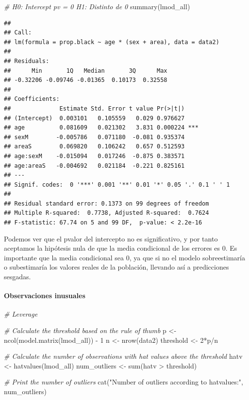 \documentclass[
]{article}
\newenvironment{Shaded}{\begin{snugshade}}{\end{snugshade}}
\newcommand{\CommentTok}[1]{\textcolor[rgb]{0.56,0.35,0.01}{\textit{#1}}}
\newcommand{\DecValTok}[1]{\textcolor[rgb]{0.00,0.00,0.81}{#1}}
\newcommand{\FunctionTok}[1]{\textcolor[rgb]{0.00,0.00,0.00}{#1}}
\newcommand{\NormalTok}[1]{#1}
\newcommand{\OtherTok}[1]{\textcolor[rgb]{0.56,0.35,0.01}{#1}}
\newcommand{\SpecialCharTok}[1]{\textcolor[rgb]{0.00,0.00,0.00}{#1}}
\newcommand{\StringTok}[1]{\textcolor[rgb]{0.31,0.60,0.02}{#1}}
\begin{document}
\begin{Shaded}
\begin{Highlighting}[]
\CommentTok{\# H0: Intercept pv = 0 H1: Distinto de 0}
\FunctionTok{summary}\NormalTok{(lmod\_all)}
\end{Highlighting}
\end{Shaded}

\begin{verbatim}
## 
## Call:
## lm(formula = prop.black ~ age * (sex + area), data = data2)
## 
## Residuals:
##      Min       1Q   Median       3Q      Max 
## -0.32206 -0.09746 -0.01365  0.10173  0.32558 
## 
## Coefficients:
##              Estimate Std. Error t value Pr(>|t|)    
## (Intercept)  0.003101   0.105559   0.029 0.976627    
## age          0.081609   0.021302   3.831 0.000224 ***
## sexM        -0.005786   0.071180  -0.081 0.935374    
## areaS        0.069820   0.106242   0.657 0.512593    
## age:sexM    -0.015094   0.017246  -0.875 0.383571    
## age:areaS   -0.004692   0.021184  -0.221 0.825161    
## ---
## Signif. codes:  0 '***' 0.001 '**' 0.01 '*' 0.05 '.' 0.1 ' ' 1
## 
## Residual standard error: 0.1373 on 99 degrees of freedom
## Multiple R-squared:  0.7738, Adjusted R-squared:  0.7624 
## F-statistic: 67.74 on 5 and 99 DF,  p-value: < 2.2e-16
\end{verbatim}

Podemos ver que el pvalor del intercepto no es significativo, y por
tanto aceptamos la hipótesis nula de que la media condicional de los
errores es 0. Es importante que la media condicional sea 0, ya que si no
el modelo sobreestimaría o subestimaría los valores reales de la
población, llevando así a predicciones sesgadas.

\hypertarget{observaciones-inusuales}{%
\paragraph{Observaciones inusuales}\label{observaciones-inusuales}}

\begin{Shaded}
\begin{Highlighting}[]
\CommentTok{\# Leverage}

\CommentTok{\# Calculate the threshold based on the rule of thumb}
\NormalTok{p }\OtherTok{\textless{}{-}} \FunctionTok{ncol}\NormalTok{(}\FunctionTok{model.matrix}\NormalTok{(lmod\_all)) }\SpecialCharTok{{-}} \DecValTok{1}
\NormalTok{n }\OtherTok{\textless{}{-}} \FunctionTok{nrow}\NormalTok{(data2)}
\NormalTok{threshold }\OtherTok{\textless{}{-}} \DecValTok{2}\SpecialCharTok{*}\NormalTok{p}\SpecialCharTok{/}\NormalTok{n}

\CommentTok{\# Calculate the number of observations with hat values above the threshold}
\NormalTok{hatv }\OtherTok{\textless{}{-}} \FunctionTok{hatvalues}\NormalTok{(lmod\_all)}
\NormalTok{num\_outliers }\OtherTok{\textless{}{-}} \FunctionTok{sum}\NormalTok{(hatv }\SpecialCharTok{\textgreater{}}\NormalTok{ threshold)}

\CommentTok{\# Print the number of outliers}
\FunctionTok{cat}\NormalTok{(}\StringTok{"Number of outliers according to hatvalues:"}\NormalTok{, num\_outliers)}
\end{Highlighting}
\end{Shaded}
\end{document}
